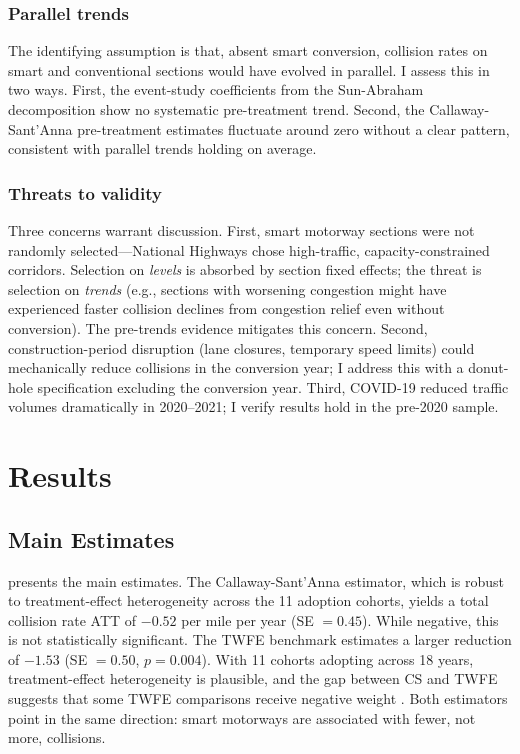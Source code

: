 \documentclass[12pt]{article}
\begin{document}
\subsubsection*{Parallel trends} The identifying assumption is that, absent smart conversion, collision rates on smart and conventional sections would have evolved in parallel. I assess this in two ways. First, the event-study coefficients from the Sun-Abraham decomposition show no systematic pre-treatment trend. Second, the Callaway-Sant'Anna pre-treatment estimates fluctuate around zero without a clear pattern, consistent with parallel trends holding on average.

\subsubsection*{Threats to validity} Three concerns warrant discussion. First, smart motorway sections were not randomly selected---National Highways chose high-traffic, capacity-constrained corridors. Selection on \textit{levels} is absorbed by section fixed effects; the threat is selection on \textit{trends} (e.g., sections with worsening congestion might have experienced faster collision declines from congestion relief even without conversion). The pre-trends evidence mitigates this concern. Second, construction-period disruption (lane closures, temporary speed limits) could mechanically reduce collisions in the conversion year; I address this with a donut-hole specification excluding the conversion year. Third, COVID-19 reduced traffic volumes dramatically in 2020--2021; I verify results hold in the pre-2020 sample.


\section{Results}

\subsection{Main Estimates}



 presents the main estimates. The Callaway-Sant'Anna estimator, which is robust to treatment-effect heterogeneity across the 11 adoption cohorts, yields a total collision rate ATT of $-0.52$ per mile per year (SE $= 0.45$). While negative, this is not statistically significant. The TWFE benchmark estimates a larger reduction of $-1.53$ (SE $= 0.50$, $p = 0.004$). With 11 cohorts adopting across 18 years, treatment-effect heterogeneity is plausible, and the gap between CS and TWFE suggests that some TWFE comparisons receive negative weight \citep{goodman-bacon_2021}. Both estimators point in the same direction: smart motorways are associated with fewer, not more, collisions.
\end{document}

